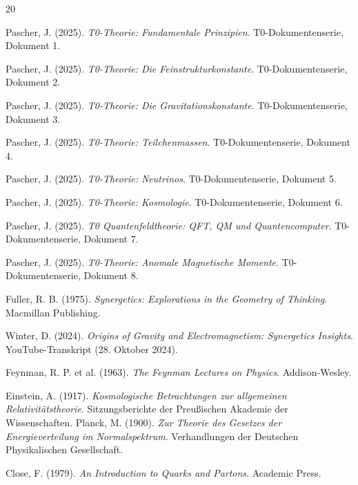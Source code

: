 	\begin{thebibliography}{20}
		
		Pascher, J. (2025). 
		\textit{T0-Theorie: Fundamentale Prinzipien}. 
		T0-Dokumentenserie, Dokument 1.
		
		Pascher, J. (2025). 
		\textit{T0-Theorie: Die Feinstrukturkonstante}. 
		T0-Dokumentenserie, Dokument 2.
		
		Pascher, J. (2025). 
		\textit{T0-Theorie: Die Gravitationskonstante}. 
		T0-Dokumentenserie, Dokument 3.
		
		Pascher, J. (2025). 
		\textit{T0-Theorie: Teilchenmassen}. 
		T0-Dokumentenserie, Dokument 4.
		
		Pascher, J. (2025). 
		\textit{T0-Theorie: Neutrinos}. 
		T0-Dokumentenserie, Dokument 5.
		
		Pascher, J. (2025). 
		\textit{T0-Theorie: Kosmologie}. 
		T0-Dokumentenserie, Dokument 6.
		
		Pascher, J. (2025). 
		\textit{T0 Quantenfeldtheorie: QFT, QM und Quantencomputer}. 
		T0-Dokumentenserie, Dokument 7.
		
		Pascher, J. (2025). 
		\textit{T0-Theorie: Anomale Magnetische Momente}. 
		T0-Dokumentenserie, Dokument 8.
		
		Fuller, R. B. (1975). 
		\textit{Synergetics: Explorations in the Geometry of Thinking}. 
		Macmillan Publishing.
		
		Winter, D. (2024). 
		\textit{Origins of Gravity and Electromagnetism: Synergetics Insights}. 
		YouTube-Transkript (28. Oktober 2024).
		
		Feynman, R. P. et al. (1963). 
		\textit{The Feynman Lectures on Physics}. 
		Addison-Wesley.
		
		Einstein, A. (1917). 
		\textit{Kosmologische Betrachtungen zur allgemeinen Relativitätstheorie}. 
		Sitzungsberichte der Preußischen Akademie der Wissenschaften.
Planck, M. (1900). 
\textit{Zur Theorie des Gesetzes der Energieverteilung im Normalspektrum}. 
Verhandlungen der Deutschen Physikalischen Gesellschaft.

Close, F. (1979). 
\textit{An Introduction to Quarks and Partons}. 
Academic Press.


\end{thebibliography}
